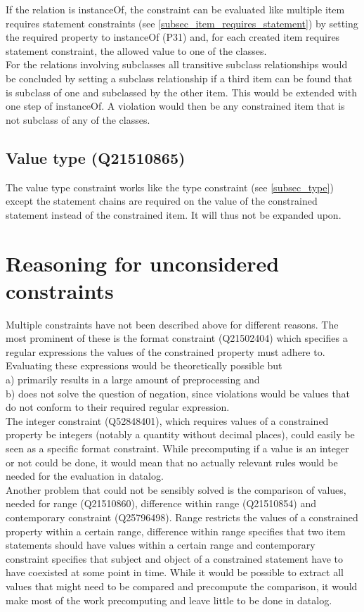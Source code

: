 \documentclass[hyperref,bachelorofscience,fleqn]{cgvpub}
\begin{document}
If the relation is instanceOf, the constraint can be evaluated like multiple item requires statement constraints (see \ref{subsec_item_requires_statement}) by setting the required property to instanceOf (P31) and, for each created item requires statement constraint, the allowed value to one of the classes. \\
For the relations involving subclasses all transitive subclass relationships would be concluded by setting a subclass relationship if a third item can be found that is subclass of one and subclassed by the other item. This would be extended with one step of instanceOf. A violation would then be any constrained item that is not subclass of any of the classes.

\subsection{Value type (Q21510865)}
The value type constraint works like the type constraint (see \ref{subsec_type}) except the statement chains are required on the value of the constrained statement instead of the constrained item. It will thus not be expanded upon.

\section{Reasoning for unconsidered constraints}
Multiple constraints have not been described above for different reasons. The most prominent of these is the format constraint (Q21502404) which specifies a regular expressions the values of the constrained property must adhere to. Evaluating these expressions would be theoretically possible but \\
a) primarily results in a large amount of preprocessing and\\
b) does not solve the question of negation, since violations would be values that do not conform to their required regular expression. \\

The integer constraint (Q52848401), which requires values of a constrained property be integers (notably a quantity without decimal places), could easily be seen as a specific format constraint. While precomputing if a value is an integer or not could be done, it would mean that no actually relevant rules would be needed for the evaluation in datalog. \\

Another problem that could not be sensibly solved is the comparison of values, needed for range (Q21510860), difference within range (Q21510854) and contemporary constraint (Q25796498). Range restricts the values of a constrained property within a certain range, difference within range specifies that two item statements should have values within a certain range and contemporary constraint specifies that subject and object of a constrained statement have to have coexisted at some point in time. While it would be possible to extract all values that might need to be compared and precompute the comparison, it would make most of the work precomputing and leave little to be done in datalog.\\
\end{document}
